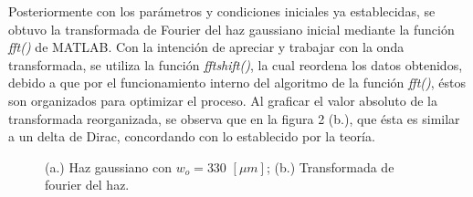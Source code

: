 \documentclass[11pt,letterpaper,twocolumn]{article}
\begin{document}
Posteriormente con los parámetros y condiciones iniciales ya establecidas, se obtuvo la transformada de Fourier del haz gaussiano inicial mediante la función \textit{fft()} de MATLAB. Con la intención de apreciar y trabajar con la onda transformada, se utiliza la función \textit{fftshift()}, la cual reordena los datos obtenidos, debido a que por el funcionamiento interno del algoritmo de la función \textit{fft()}, éstos son organizados para optimizar el proceso. Al graficar el valor absoluto de la transformada reorganizada, se observa que en la figura 2 (b.), que ésta es similar a un delta de Dirac, concordando con lo establecido por la teoría.\\  
\begin{figure}[h!]
\begin{center}
\caption{(a.) Haz gaussiano con $w_{o}= 330$ $[\mu m]$; (b.) Transformada de fourier del haz.}
\end{center}
\label{pos}
\end{figure}
\end{document}
